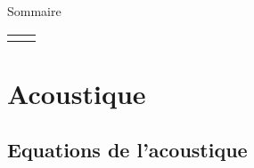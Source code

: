 
\begin{frame}{Sommaire}

\small
  
\hspace*{2mm}
\begin{tabular}{cc}
  		\begin{minipage}{62mm}
  			\tableofcontents[firstsection=-8]
      \vspace{15mm}
  		\end{minipage}
  		&   
  		\begin{minipage}{60cm}
		  \vspace*{-5mm}  
  		\end{minipage}
  	\end{tabular}

\vspace{0mm}

\end{frame}

\section{\bfseries Acoustique}
\subsection{Equations de l'acoustique}

